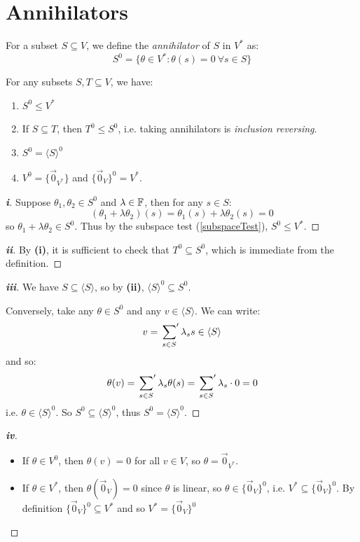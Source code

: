 \documentclass[../main.tex]{subfiles}
\begin{document}
\section{Annihilators}
\begin{definition}[Annihilator]
  For a subset $S \subseteq V$, we define the \textit{annihilator} of $S$ in $V^{*}$ as:
  \[
    S^{0} = \{\theta \in V^{*}: \theta(s) = 0\ \forall s \in S\}
  \]
\end{definition}
\begin{lemma}
  For any subsets $S, T \subseteq V$, we have: \label{annaProp}
  \begin{enumerate}
    \item $S^{0} \leq V^{*}$
    \item If $S \subseteq T$, then $T^{0} \leq S^{0}$, i.e. taking annihilators is \textit{inclusion reversing}.
    \item $S^{0} = \langle S \rangle^{0}$
    \item $V^{0} = \{\vec{0}_{V^{*}}\}$ and $\{\vec{0}_{V}\}^{0} = V^{*}$.
  \end{enumerate}
\end{lemma}
\begin{proof}[\textbf{i}]
  Suppose $\theta_1, \theta_2 \in S^{0}$ and $\lambda \in \mathbb{F}$, then for any $s \in S$:
  \[
    (\theta_1 + \lambda \theta_2)(s) = \theta_1(s) + \lambda \theta_2(s) = 0
  \]
  so $\theta_1 + \lambda \theta_2 \in S^{0}$.
  Thus by the subspace test (\cref{subspaceTest}), $S^{0} \leq V^{*}$.
\end{proof}
\begin{proof}[\textbf{ii}]
  By \textbf{(i)}, it is sufficient to check that $T^{0} \subseteq S^{0}$, which is immediate from the definition.
\end{proof}
\begin{proof}[\textbf{iii}]
  We have $S \subseteq \langle S \rangle$, so by \textbf{(ii)}, $\langle S \rangle^{0} \subseteq S^{0}$.

  Conversely, take any $\theta \in S^{0}$ and any $v \in \langle S \rangle$.
  We can write:
  \[
    v = \sideset{}{'}\sum_{s \in S} \lambda_s s \in \langle S \rangle
  \]
  and so:
  \[
    \theta(v) = \sideset{}{'}\sum_{s \in S} \lambda_s \theta(s) = \sideset{}{'}\sum_{s \in S} \lambda_s \cdot 0 = 0
  \]
  i.e. $\theta \in \langle S \rangle^{0}$.
  So $S^{0} \subseteq \langle S \rangle^{0}$, thus $S^{0} = \langle S \rangle^{0}$.
\end{proof}
\begin{proof}[\textbf{iv}]
  \begin{itemize}
    \item If $\theta \in V^{0}$, then $\theta(v) = 0$ for all $v \in V$, so $\theta = \vec{0}_{V^{*}}$.
    \item If $\theta \in V^{*}$, then $\theta(\vec{0}_{V}) = 0$ since $\theta$ is linear, so $\theta \in \{\vec{0}_{V}\}^{0}$, i.e. $V^{*} \subseteq \{\vec{0}_{V}\}^{0}$.
      By definition $\{\vec{0}_{V}\}^{0} \subseteq V^{*}$ and so $V^{*} = \{\vec{0}_{V}\}^{0}$
  \end{itemize}
\end{proof}
\end{document}
